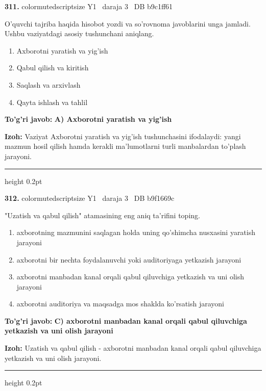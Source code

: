\documentclass[10pt,a4paper,oneside]{article}
\begin{document}
\noindent\textbf{\color{ink}311.}  {color{muted}scriptsize Y1 \textbullet\ daraja 3 \textbullet\ DB b9c1ff61}
\par
O'quvchi tajriba haqida hisobot yozdi va so'rovnoma javoblarini unga jamladi. Ushbu vaziyatdagi asosiy tushunchani aniqlang.
\begin{enumerate}[label=\Alph*),leftmargin=9mm]
\item Axborotni yaratish va yig'ish
\item Qabul qilish va kiritish
\item Saqlash va arxivlash
\item Qayta ishlash va tahlil
\end{enumerate}
\begin{tcolorbox}[enhanced,breakable,colback=teal!4,colframe=teal!50!black,boxrule=0.5pt,arc=1.1mm,left=3mm,right=3mm,top=1.7mm,bottom=1.7mm,before skip=2mm,after skip=2mm]
\textbf{\color{teal}To'g'ri javob:} \textbf{A) Axborotni yaratish va yig'ish}
\par\smallskip
\textbf{Izoh:} Vaziyat Axborotni yaratish va yig'ish tushunchasini ifodalaydi: yangi mazmun hosil qilish hamda kerakli ma'lumotlarni turli manbalardan to'plash jarayoni.
\end{tcolorbox}
\vspace{2mm}\hrule height 0.2pt \vspace{3mm}

\noindent\textbf{\color{ink}312.}  {color{muted}scriptsize Y1 \textbullet\ daraja 3 \textbullet\ DB b9f1669c}
\par
"Uzatish va qabul qilish" atamasining eng aniq ta'rifini toping.
\begin{enumerate}[label=\Alph*),leftmargin=9mm]
\item axborotning mazmunini saqlagan holda uning qo'shimcha nusxasini yaratish jarayoni
\item axborotni bir nechta foydalanuvchi yoki auditoriyaga yetkazish jarayoni
\item axborotni manbadan kanal orqali qabul qiluvchiga yetkazish va uni olish jarayoni
\item axborotni auditoriya va maqsadga mos shaklda ko'rsatish jarayoni
\end{enumerate}
\begin{tcolorbox}[enhanced,breakable,colback=teal!4,colframe=teal!50!black,boxrule=0.5pt,arc=1.1mm,left=3mm,right=3mm,top=1.7mm,bottom=1.7mm,before skip=2mm,after skip=2mm]
\textbf{\color{teal}To'g'ri javob:} \textbf{C) axborotni manbadan kanal orqali qabul qiluvchiga yetkazish va uni olish jarayoni}
\par\smallskip
\textbf{Izoh:} Uzatish va qabul qilish - axborotni manbadan kanal orqali qabul qiluvchiga yetkazish va uni olish jarayoni.
\end{tcolorbox}
\vspace{2mm}\hrule height 0.2pt \vspace{3mm}
\end{document}
